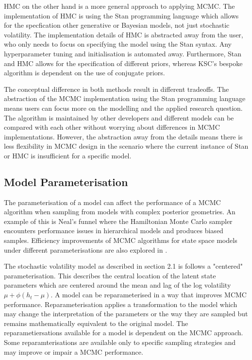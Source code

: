 \documentclass[12pt, a4paper]{article}
\begin{document}
        HMC on the other hand is a more general approach to applying MCMC. The implementation of HMC is using the Stan programming language which allows for the specfication other generative or Bayesian models, not just stochastic volatility. The implementation details of HMC is abstracted away from the user, who only needs to focus on specifying the model using the Stan syntax. Any hyperparameter tuning and initialisation is automated away. Furthermore, Stan and HMC allows for the specification of different priors, whereas KSC's bespoke algorithm is dependent on the use of conjugate priors. 

        The conceptual difference in both methods result in different tradeoffs. The abstraction of the MCMC implementation using the Stan programming language means users can focus more on the modelling and the applied research question. The algorithm is maintained by other developers and different models can be compared with each other without worrying about differences in MCMC implementations. However, the abstraction away from the details means there is less flexibility in MCMC design in the scenario where the current instance of Stan or HMC is insufficient for a specific model.
        
    \subsection{Model Parameterisation}

        The parameterisation of a model can affect the performance of a MCMC algorithm when sampling from models with complex posterior geometries. An example of this is Neal's funnel \citep{neal2003slice} where the Hamiltonian Monte Carlo sampler encounters performance issues in hierarchical models and produces biased samples. Efficiency improvements of MCMC algorithms for state space models under different parameterisations are also explored in \citet{strickland2008parameterisation}.

        The stochastic volatility model as described in section 2.1 is follows a "centered" parameterisation. This describes the central location of the latent state parameters which are centered around the mean and lag of the log volatility $\mu +\phi(h_t - \mu)$. A model can be reparameterised in a way that improves MCMC performance. Reparameterisation applies a transformation to the model which may change the interpretation of the parameters or the way they are sampled but remains mathematically equivalent to the original model. The reparametiersations available for a model is dependent on the MCMC approach. Some reparamterisations are available only to specific sampling strategies and may improve or impair a MCMC performance. 
\end{document}
